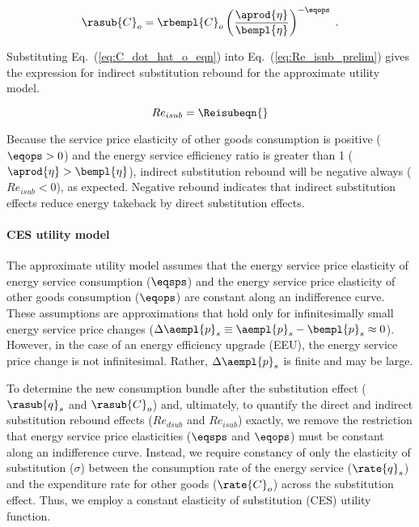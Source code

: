 \begin{equation} \label{eq:C_dot_hat_o_eqn}
  \rasub{C}_o = \rbempl{C}_o \left( \frac{\aprod{\eta}}{\bempl{\eta}} \right)^{-\eqops} \; .
\end{equation}

Substituting Eq.~(\ref{eq:C_dot_hat_o_eqn}) into Eq.~(\ref{eq:Re_isub_prelim})
gives the expression for 
indirect substitution rebound for the approximate utility model.

\begin{equation}
  Re_{isub} = \Reisubeqn{}
\end{equation}

Because the service price elasticity of other goods consumption is positive ($\eqops > 0$) and
the energy service efficiency ratio is greater than 1 ($\aprod{\eta} > \bempl{\eta}$),
indirect substitution rebound will be negative always ($Re_{isub} < 0$),
as expected.
Negative rebound indicates that indirect substitution effects 
reduce energy takeback by direct substitution effects.


\paragraph{CES utility model}
\label{sec:Resub_exact_method}

The approximate utility model assumes that 
the energy service price elasticity of energy service consumption ($\eqsps$) and
the energy service price elasticity of other goods consumption ($\eqops$)
are constant along an indifference curve.
These assumptions are approximations that hold only 
for infinitesimally small energy service price changes 
($\Delta \aempl{p}_s \equiv \aempl{p}_s - \bempl{p}_s \approx 0$).
However, in the case of an energy efficiency upgrade (EEU), 
the energy service price change is not infinitesimal.
Rather, 
$\Delta \aempl{p}_s$ is finite and may be large.

To determine the new consumption bundle after the substitution effect 
($\rasub{q}_s$ and $\rasub{C}_o$)
and,
ultimately, to quantify the direct and indirect substitution rebound effects
($Re_{dsub}$ and $Re_{isub}$) exactly,
we remove the restriction that energy service price elasticities ($\eqsps$ and $\eqops$)
must be constant along an indifference curve.
Instead, we require constancy of only
the elasticity of substitution ($\sigma$) between
the consumption rate of the energy service ($\rate{q}_s$)
and the expenditure rate for other goods ($\rate{C}_o$)
across the substitution effect.
Thus, we employ a constant elasticity of substitution (CES)
utility function.

